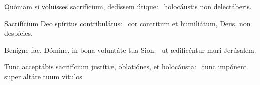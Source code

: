 \item Quóniam si voluísses sacrifícium, dedíssem útique:~\psstar{} holocáustis non delectáberis.

\item Sacrifícium Deo spíritus contribulátus:~\psstar{} cor contrítum et humiliátum, Deus, non despícies.

\item Benígne fac, Dómine, in bona voluntáte tua Sion:~\psstar{} ut ædificéntur muri Jerúsalem.

\item Tunc acceptábis sacrifícium justítiæ, oblatiónes, et holocáusta:~\psstar{} tunc impónent super altáre tuum vítulos.